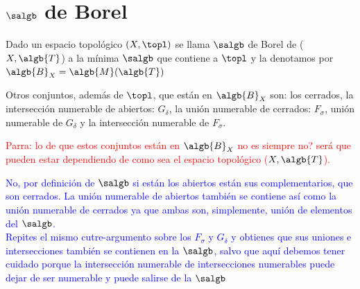 \documentclass{apuntes}
\begin{document}
\section{$\salgb$ de Borel}
\begin{defn}
Dado un espacio topológico $(X,\topl)$ se llama $\salgb$ de Borel de ($X, \algb{T}$) a la mínima $\salgb$ que contiene a $\topl$ y la denotamos por $\algb{B}_X=\algb{M}(\algb{T})$

\end{defn}

\obs Otros conjuntos, además de $\topl$, que están en $\algb{B}_X$ son: los cerrados, la intersección numerable de abiertos: $G_\delta$, la unión numerable de cerrados: $F_\sigma$, unión numerable de $G_\delta$ y la intersección numerable de $F_\sigma$.

\textcolor{red}{Parra: lo de que estos conjuntos están en $\algb{B}_X$ no es siempre no? será que pueden estar dependiendo de como sea el espacio topológico ($X, \algb{T}$).}

\textcolor{blue}{No, por definición de $\salgb$ si están los abiertos están sus complementarios, que son cerrados. La unión numerable de abiertos también se contiene así como la unión numerable de cerrados ya que ambas son, simplemente, unión de elementos del $\salgb$.\\
Repites el mismo cutre-argumento sobre los $F_\sigma$ y $G_\delta$ y obtienes que sus uniones e intersecciones también se contienen en la $\salgb$, salvo que aquí debemos tener cuidado porque la intersección numerable de intersecciones numerables puede dejar de ser numerable y puede salirse de la $\salgb$}
\end{document}
